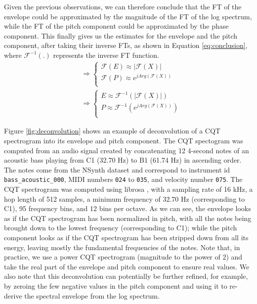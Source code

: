 \documentclass[journal]{IEEEtran}
\begin{document}
Given the previous observations, we can therefore conclude that the FT of the envelope could be approximated by the magnitude of the FT of the log spectrum, while the FT of the pitch component could be approximated by the phase component. This finally gives us the estimates for the envelope and the pitch component, after taking their inverse FTs, as shown in Equation \ref{eq:conclusion}, where $\mathcal{F}^{-1}(.)$ represents the inverse FT function.
\begin{equation}
\label{eq:conclusion}
\begin{split}
& \Rightarrow 
\begin{cases}
\mathcal{F}(E) \approx |\mathcal{F}(X)| \\
\mathcal{F}(P) \approx e^{j Arg(\mathcal{F}(X))} \\
\end{cases} \\
& \Rightarrow
\begin{cases}
E \approx \mathcal{F}^{-1}(|\mathcal{F}(X)|) \\
P \approx \mathcal{F}^{-1}(e^{j Arg(\mathcal{F}(X))}) \\
\end{cases}
\end{split}
\end{equation}

Figure \ref{fig:deconvolution} shows an example of deconvolution of a CQT spectrogram into its envelope and pitch component. The CQT spectogram was computed from an audio signal created by concatenating 12 4-second notes of an acoustic bass playing from C1 (32.70 Hz) to B1 (61.74 Hz) in ascending order. The notes come from the NSynth dataset \cite{engel2017} and correspond to instrument id \texttt{bass\_acoustic\_000}, MIDI numbers \texttt{024} to \texttt{035}, and velocity number \texttt{075}. The CQT spectrogram was computed using librosa \cite{mcfee2015,schoerkhuber2010}, with a sampling rate of 16 kHz, a hop length of 512 samples, a minimum frequency of 32.70 Hz (corresponding to C1), 95 frequency bins, and 12 bins per octave. As we can see, the envelope looks as if the CQT spectrogram has been normalized in pitch, with all the notes being brought down to the lowest frequency (corresponding to C1); while the pitch component looks as if the CQT spectrogram has been stripped down from all its energy, leaving mostly the fundamental frequencies of the notes. Note that, in practice, we use a power CQT spectrogram (magnitude to the power of 2) and take the real part of the envelope and pitch component to ensure real values. We also note that this deconvolution can potentially be further refined, for example, by zeroing the few negative values in the pitch component and using it to re-derive the spectral envelope from the log spectrum.
\end{document}
